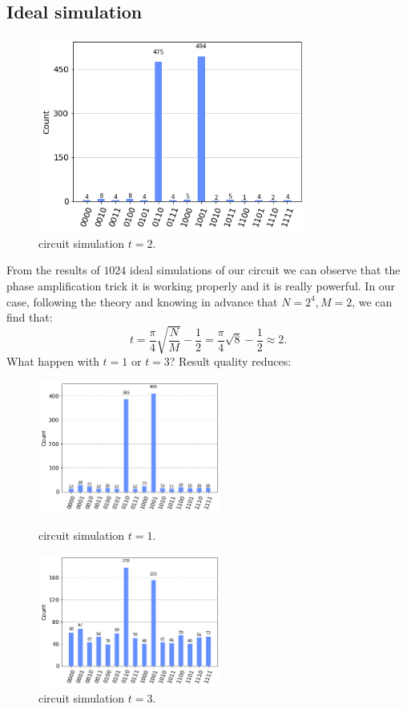 \documentclass{article}
\begin{document}
\subsection{Ideal simulation}
\begin{figure}[H]
  \centering
  \includegraphics[width=250pt]{Img/simulation-t2.png}
  \caption{circuit simulation $t=2$.}
\end{figure}
From the results of $1024$ ideal simulations of our circuit we can observe that
the phase amplification trick it is working properly and it is really powerful.
In our case, following the theory and knowing in advance that $N = 2^4, M=2$,
we can find that:
\[
  t = \frac{\pi}{4} \sqrt{\frac{N}{M}}- \frac{1}{2} = \frac{\pi}{4}
  \sqrt{8}- \frac{1}{2} \approx 2.
\]
What happen with $t= 1$ or $t=3$? Result quality reduces:
\begin{figure}[H]
  \centering
  \begin{minipage}{.5\textwidth}
    \centering
    \includegraphics[width=6cm]{Img/simulation-t1.png}
    \caption{circuit simulation $t=1$.}
  \end{minipage}%
  \begin{minipage}{.5\textwidth}
    \centering
    \includegraphics[width=6cm]{Img/simulation-t3.png}
    \caption{circuit simulation $t=3$.}
  \end{minipage}
\end{figure}
\end{document}
